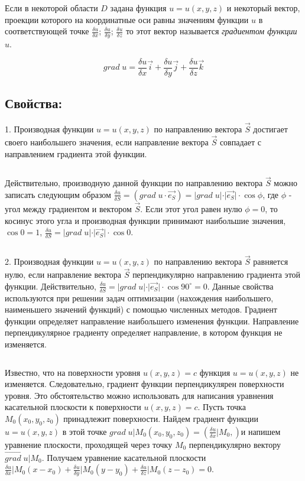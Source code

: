 \begin{definition}
    Если в некоторой области $D$ задана функция $u=u(x,y,z)$ и некоторый вектор, 
    проекции которого на координатные оси равны значениям функции $u$ в соответствующей точке $\frac{\delta{u}}{\delta{x}}$; $\frac{\delta{u}}{\delta{y}}$; $\frac{\delta{u}}{\delta{z}}$
    то этот вектор называется \textit{градиентом функции $u$}.
\end{definition}

$$grad\;u=\frac{\delta{u}}{\delta{x}}\vec{i}+\frac{\delta{u}}{\delta{y}}\vec{j}+\frac{\delta{u}}{\delta{z}}\vec{k}$$

\subsection{Свойства:}

1. Производная функции $u=u(x,y,z)$ по направлению вектора $\vec{S}$ достигает своего наибольшего значения, если направление вектора $\vec{S}$ 
совпадает с направлением градиента этой функции.

$\;$

Действительно, производную данной функции по направлению вектора $\vec{S}$ можно записать следующим образом 
$\frac{\delta{u}}{\delta{S}}=(grad\;u\cdot\vec{e_S})=\vert{grad\;u}\vert\cdot\vert\vec{e_S}\vert\cdot\cos{\phi}$, где $\phi$ - угол между градиентом и вектором $\vec{S}$. 
Если этот угол равен нулю $\phi=0$, то косинус этого угла и производная функции принимают наибольшие значения, $\cos{0}=1$, $\frac{\delta{u}}{\delta{S}}=\vert{grad\;u}\vert\cdot\vert\vec{e_S}\vert\cdot\cos{0}$.

$\;$

2. Производная функции $u=u(x,y,z)$ по направлению вектора $\vec{S}$ равняется нулю, если направление вектора $\vec{S}$ перпендикулярно направлению градиента этой функции.
Действительно, $\frac{\delta{u}}{\delta{S}}=\vert{grad\;u}\vert\cdot\vert\vec{e_S}\vert\cdot\cos{90^\circ}=0$.
Данные свойства используются при решении задач оптимизации (нахождения наибольшего, наименьшего значений функций) с помощью численных методов. 
Градиент функции определяет направление наибольшего изменения функции. 
Направление перпендикулярное градиенту определяет направление, в котором функция не изменяется.

$\;$

Известно, что на поверхности уровня $u(x,y,z)=c$ функция $u=u(x,y,z)$ не изменяется. 
Следовательно, градиент функции перпендикулярен поверхности уровня. 
Это обстоятельство можно использовать для написания уравнения касательной плоскости к поверхности $u(x,y,z)=c$. 
Пусть точка $M_0(x_0,y_0,z_0)$ принадлежит поверхности. 
Найдем градиент функции $u=u(x,y,z)$ в этой точке $grad\;u\vert{M_0(x_0,y_0,z_0)}=(\frac{\delta{u}}{\delta{x}}\vert{M_0,})$и напишем уравнение плоскости, 
проходящей через точку $M_0$ перпендикулярно вектору $\vec{grad\;u}\vert{M_0}$. Получаем уравнение касательной плоскости 
$\frac{\delta{u}}{\delta{x}}\vert{M_0}(x-x_0)+\frac{\delta{u}}{\delta{y}}\vert{M_0}(y-y_0)+\frac{\delta{u}}{\delta{z}}\vert{M_0}(z-z_0)=0$.
